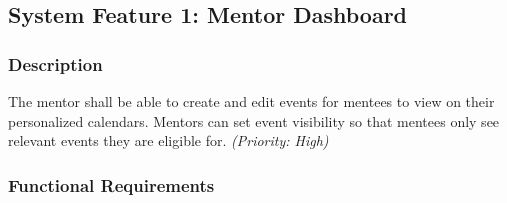 \subsection{System Feature 1: Mentor Dashboard} 


\subsubsection{Description}
The mentor shall be able to create and edit events for mentees to view on their
personalized calendars. Mentors can set event visibility so that mentees only
see relevant events they are eligible for. \textit{(Priority: High)} 



\subsubsection{Functional Requirements}

